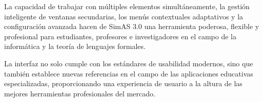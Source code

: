 La capacidad de trabajar con múltiples elementos simultáneamente, la gestión inteligente de ventanas secundarias, los menús contextuales adaptativos y la configuración avanzada hacen de SimAS 3.0 una herramienta poderosa, flexible y profesional para estudiantes, profesores e investigadores en el campo de la informática y la teoría de lenguajes formales.

La interfaz no solo cumple con los estándares de usabilidad modernos, sino que también establece nuevas referencias en el campo de las aplicaciones educativas especializadas, proporcionando una experiencia de usuario a la altura de las mejores herramientas profesionales del mercado.